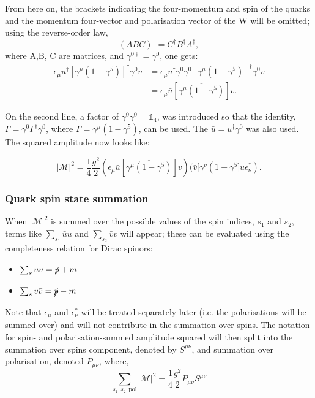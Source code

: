 \documentclass[a4paper,11pt]{article}
\begin{document}
  From here on, the brackets indicating the four-momentum and spin of the quarks and the momentum four-vector and polarisation vector of the W will be omitted; using the reverse-order law, 
  \begin{equation}\label{rev-order-law}
	  (ABC)^\dagger = C^\dagger B^\dagger A^\dagger,  	
  \end{equation}
where A,B, C are matrices, and $\gamma^{0 \dagger} = \gamma^0$,  one gets:
 \begin{equation}\label{gamma_id}
 	\begin{aligned}
 		 	\epsilon_\mu u^\dagger \left[\gamma^\mu (1-\gamma^5)\right]^\dagger \gamma^0 v &= \epsilon_\mu u^\dagger \gamma^0 \gamma^0 \left[\gamma^\mu (1-\gamma^5)\right]^\dagger \gamma^0 v \\
 		&= \epsilon_\mu \bar{u}[\overline{\gamma^\mu (1-\gamma^5)}] v.
 	\end{aligned}
 \end{equation}

 
 On the second line, a factor of $\gamma^0 \gamma^0 = \mathds{1}_4$, was introduced so that the identity, $\bar{\Gamma}= \gamma^0 \Gamma^\dagger \gamma^0$, where $\Gamma = \gamma^\mu (1-\gamma^5)$, can be used. The $\bar{u}=u^\dagger \gamma^0$ was also used. The squared amplitude now looks like:
 
 \begin{equation}\label{msquared}
 	|\mathcal{M}|^2 = \frac{1}{4} \frac{g^2}{2} (\epsilon_\mu \bar{u}[\overline{\gamma^\mu (1-\gamma^5)}]v)(\bar{v}[\gamma^\nu (1-\gamma^5] u \epsilon_\nu^*).
 \end{equation}
 
 \subsubsection{Quark spin state summation}\label{completeness}
 When $|\mathcal{M}|^2 $ is summed over the possible values of the spin indices, $s_1$ and $s_2$, terms like $\sum_{s_1} \bar{u}u$ and $\sum_{s_2} \bar{v}v$ will appear; these can be evaluated using the completeness relation for Dirac spinors: %
 \begin{itemize}
 	\item $\sum_{s}u\bar{u} =  \slashed{p}+m  $
 	\item $\sum_{s}v\bar{v} =  \slashed{p}-m  $
 \end{itemize}
 Note that $\epsilon_{\mu}$ and $\epsilon_{\nu}^*$ will be treated separately later (i.e. the polarisations will be summed over) and will not contribute in the summation over spins. The notation for spin- and polarisation-summed amplitude squared will then split into the summation over spins component, denoted by $S^{\mu\nu}$, and summation over polarisation, denoted $P_{\mu \nu}$, where, $$\sum_{s_1, s_2, \text{pol}}|\mathcal{M}|^2=  \frac{1}{4} \frac{g^2}{2}P_{\mu\nu}S^{\mu\nu} $$\\
 
\end{document}
